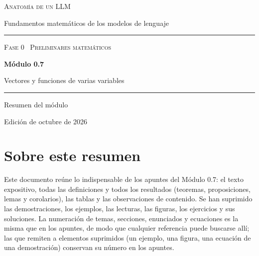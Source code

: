 \documentclass[11pt,a4paper,twoside,openany]{book}
\begin{document}
\frontmatter
\begin{titlepage}
\centering
\vspace*{2.5cm}
{\large\scshape Anatomía de un LLM}\par
\vspace{0.4cm}
{\normalsize Fundamentos matemáticos de los modelos de lenguaje}\par
\vspace{2.2cm}
\rule{\textwidth}{0.8pt}\par\vspace{0.5cm}
{\small\scshape Fase 0 \textperiodcentered\ Preliminares matemáticos}\par\vspace{0.3cm}
{\Huge\bfseries Módulo 0.7\par}\vspace{0.3cm}
{\LARGE Vectores y funciones de varias variables\par}
\vspace{0.5cm}\rule{\textwidth}{0.4pt}\par
\vspace{1.6cm}
{\large Resumen del módulo}\par
\vfill
{\small Edición de octubre de 2026}\par
\end{titlepage}

\chapter*{Sobre este resumen}

Este documento reúne lo indispensable de los apuntes del Módulo 0.7: el texto expositivo, todas las definiciones y todos los resultados (teoremas, proposiciones, lemas y corolarios), las tablas y las observaciones de contenido. Se han suprimido las demostraciones, los ejemplos, las lecturas, las figuras, los ejercicios y sus soluciones. La numeración de temas, secciones, enunciados y ecuaciones es la misma que en los apuntes, de modo que cualquier referencia puede buscarse allí; las que remiten a elementos suprimidos (un ejemplo, una figura, una ecuación de una demostración) conservan su número en los apuntes.
\end{document}
